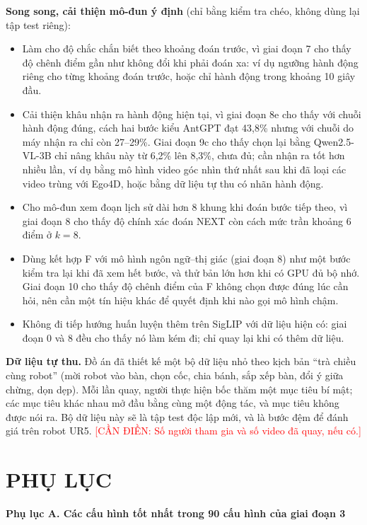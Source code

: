 \documentclass[a4paper,oneside]{report}
\renewcommand{\thetable}{\thechapter.\arabic{table}}
\newcommand{\unchapter}[1]{%
  \chapter*{#1}%
  \addcontentsline{toc}{chapter}{#1}}
\newcommand{\mucnho}[1]{\par\vspace{4pt}\noindent\textbf{#1}\par\nobreak}
\newcommand{\TODO}[1]{\textcolor{red}{[CẦN ĐIỀN: #1]}}
\begin{document}
\textbf{Song song, cải thiện mô-đun ý định} (chỉ bằng kiểm tra chéo, không dùng lại tập test riêng):
\begin{itemize}
  \item Làm cho độ chắc chắn biết theo khoảng đoán trước, vì giai đoạn 7 cho thấy độ chênh điểm gần như không đổi khi phải đoán xa: ví dụ ngưỡng hành động riêng cho từng khoảng đoán trước, hoặc chỉ hành động trong khoảng 10 giây đầu.
  \item Cải thiện khâu nhận ra hành động hiện tại, vì giai đoạn 8e cho thấy với chuỗi hành động đúng, cách hai bước kiểu AntGPT \citep{zhao2024antgpt} đạt 43,8\% nhưng với chuỗi do máy nhận ra chỉ còn 27--29\%. Giai đoạn 9c cho thấy chọn lại bằng Qwen2.5-VL-3B chỉ nâng khâu này từ 6,2\% lên 8,3\%, chưa đủ; cần nhận ra tốt hơn nhiều lần, ví dụ bằng mô hình video góc nhìn thứ nhất sau khi đã loại các video trùng với Ego4D, hoặc bằng dữ liệu tự thu có nhãn hành động.
  \item Cho mô-đun xem đoạn lịch sử dài hơn 8 khung khi đoán bước tiếp theo, vì giai đoạn 8 cho thấy độ chính xác đoán NEXT còn cách mức trần khoảng 6 điểm ở $k=8$.
  \item Dùng kết hợp F với mô hình ngôn ngữ--thị giác (giai đoạn 8) như một bước kiểm tra lại khi đã xem hết bước, và thử bản lớn hơn khi có GPU đủ bộ nhớ. Giai đoạn 10 cho thấy độ chênh điểm của F không chọn được đúng lúc cần hỏi, nên cần một tín hiệu khác để quyết định khi nào gọi mô hình chậm.
  \item Không đi tiếp hướng huấn luyện thêm trên SigLIP với dữ liệu hiện có: giai đoạn 0 và 8 đều cho thấy nó làm kém đi; chỉ quay lại khi có thêm dữ liệu.
\end{itemize}

\textbf{Dữ liệu tự thu.} Đồ án đã thiết kế một bộ dữ liệu nhỏ theo kịch bản ``trà chiều cùng robot'' (mời robot vào bàn, chọn cốc, chia bánh, sắp xếp bàn, đổi ý giữa chừng, dọn dẹp). Mỗi lần quay, người thực hiện bốc thăm một mục tiêu bí mật; các mục tiêu khác nhau mở đầu bằng cùng một động tác, và mục tiêu không được nói ra. Bộ dữ liệu này sẽ là tập test độc lập mới, và là bước đệm để đánh giá trên robot UR5. \TODO{Số người tham gia và số video đã quay, nếu có.}

\unchapter{PHỤ LỤC}
\label{chap:appendix}
\renewcommand{\thetable}{PL.\arabic{table}}
\setcounter{table}{0}

\mucnho{Phụ lục A. Các cấu hình tốt nhất trong 90 cấu hình của giai đoạn 3}
\end{document}
